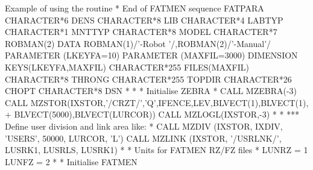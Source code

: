\begin{XMPt}{Example of using the routine \protect{}}
* End of FATMEN sequence FATPARA                                        
      CHARACTER*6  DENS                                                 
      CHARACTER*8  LIB                                                  
      CHARACTER*4  LABTYP                                               
      CHARACTER*1  MNTTYP                                               
      CHARACTER*8  MODEL                                                
      CHARACTER*7  ROBMAN(2)                                            
      DATA         ROBMAN(1)/'-Robot '/,ROBMAN(2)/'-Manual'/            
      PARAMETER (LKEYFA=10)                                             
      PARAMETER (MAXFIL=3000)                                           
      DIMENSION KEYS(LKEYFA,MAXFIL)                                     
      CHARACTER*255 FILES(MAXFIL)                                       
      CHARACTER*8   THRONG                                              
      CHARACTER*255 TOPDIR                                              
      CHARACTER*26  CHOPT                                               
      CHARACTER*8   DSN                                                 
*                                                                       
*                                                                       
*     Initialise ZEBRA                                                  
*                                                                       
      CALL MZEBRA(-3)                                                   
      CALL MZSTOR(IXSTOR,'/CRZT/','Q',IFENCE,LEV,BLVECT(1),BLVECT(1),   
     +            BLVECT(5000),BLVECT(LURCOR))                          
      CALL MZLOGL(IXSTOR,-3)                                            
*                                                                       
* *** Define user division and link area like:                          
*                                                                       
      CALL MZDIV  (IXSTOR, IXDIV, 'USERS', 50000, LURCOR, 'L')          
      CALL MZLINK (IXSTOR, '/USRLNK/', LUSRK1, LUSRLS, LUSRK1)          
*                                                                       
*     Units for FATMEN RZ/FZ files                                      
*                                                                       
      LUNRZ = 1                                                         
      LUNFZ = 2                                                         
*                                                                       
*     Initialise FATMEN                                                 

\end{XMPt}
